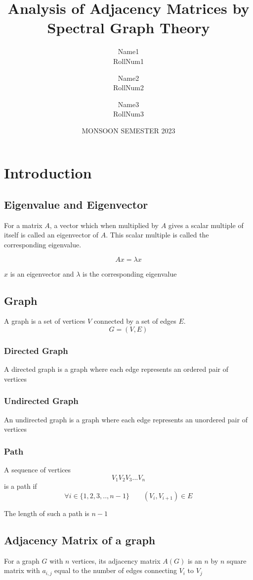 \documentclass[12pt, a4paper]{article}
\title{Analysis of Adjacency Matrices by Spectral Graph Theory}
\author{
  Name1 \\
  RollNum1
  \and
  Name2 \\
  RollNum2
  \and
  Name3 \\
  RollNum3
}
\date{MONSOON SEMESTER 2023}
\begin{document}
    \begin{titlepage}
      \maketitle
      \thispagestyle{empty}
    \end{titlepage}

    \section{Introduction}

      \subsection{Eigenvalue and Eigenvector}
      For a matrix $A$, a vector which when multiplied by $A$ gives a scalar multiple of itself is called an eigenvector of $A$. This scalar multiple is called the corresponding eigenvalue.

      $$Ax = \lambda x$$

      $x$ is an eigenvector and $\lambda$ is the corresponding eigenvalue

      \subsection{Graph}
      A graph is a set of vertices $V$ connected by a set of edges $E$.  
      $$G = (V, E)$$
        \subsubsection{Directed Graph}
        A directed graph is a graph where each edge represents an ordered pair of vertices
        \subsubsection{Undirected Graph}
        An undirected graph is a graph where each edge represents an unordered pair of vertices

        \subsubsection{Path}
        A sequence of vertices $$V_1V_2V_3...V_n$$ is a path if 
        $$\forall i \in \{1,2,3,..,n-1\} \qquad (V_{i}, V_{i+1}) \in E$$

        The length of such a path is $n-1$

      \subsection{Adjacency Matrix of a graph}
      For a graph $G$ with $n$ vertices, its adjacency matrix $A(G)$ is an $n$ by $n$ square matrix with $a_{i,j}$ equal to the number of edges connecting $V_i$ to $V_j$
\end{document}
